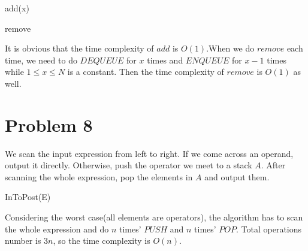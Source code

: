 \documentclass[]{article}
\begin{document}
	\begin{algorithm}[h]
	\caption{add(x)} %
		\begin{algorithmic}[1]
		\end{algorithmic}
	\end{algorithm}	 

	\begin{algorithm}[h]
	\caption{remove} %
		\begin{algorithmic}[1]
		\EndWhile
		\end{algorithmic}
	\end{algorithm}
	
	It is obvious that the time complexity of $add$ is $O(1)$.When we do $remove$ each time, we need to do $DEQUEUE$ for $x$ times and $ENQUEUE$ for $x-1$ times while $1\leq x\leq N$ is a constant. Then the time complexity of $remove$ is $O(1)$ as well.
	 
	\section{Problem 8}  
	We scan the input expression from left to right. If we come across an operand, output it directly. Otherwise, push the operator we meet to a stack $A$. After scanning the whole expression, pop the elements in $A$ and output them.
	
		\begin{algorithm}[h]
		\caption{InToPost(E)} %
		\begin{algorithmic}[1]
			\Else
			\EndIf
			\EndFor
			\Repeat
		\end{algorithmic}
	\end{algorithm}

	Considering the worst case(all elements are operators), the algorithm has to scan the whole expression and do $n$ times' $PUSH$ and $n$ times' $POP$. Total operations number is $3n$, so the time complexity is $O(n)$.
	
\end{document}
